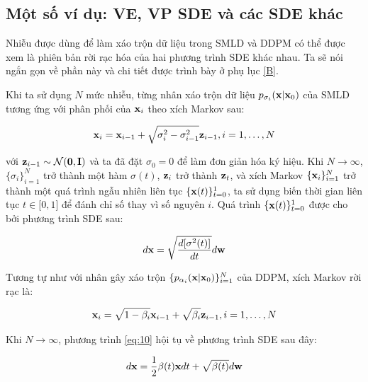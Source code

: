 \documentclass{article} %
\begin{document}
\subsection{Một số ví dụ: VE, VP SDE và các SDE khác}

Nhiễu được dùng để làm xáo trộn dữ liệu trong SMLD và DDPM có thể được xem là phiên bản rời rạc hóa của hai phương trình SDE khác nhau.
Ta sẽ nói ngắn gọn về phần này và chi tiết được trình bày ở phụ lục \ref{B}.

Khi ta sử dụng $N$ mức nhiễu, từng nhân xáo trộn dữ liệu $p_{\sigma_i}(\bold{x} \vert \bold{x}_0)$ của SMLD tương ứng với phân phối của $\bold{x}_i$ theo xích Markov sau:

\begin{equation}
    \bold{x}_i = \bold{x}_{i-1} + \sqrt{\sigma_i^2 - \sigma_{i-1}^2} \bold{z}_{i-1}, i=1, \dots, N
\end{equation}

với $\bold{z}_{i-1} \sim \mathcal{N}(\bold{0}, \bold{I})$ và ta đã đặt $\sigma_0=0$ để làm đơn giản hóa ký hiệu.
Khi $N \rightarrow \infty$, $\lbrace \sigma_i \rbrace_{i=1}^N$ trở thành một hàm $\sigma(t)$, $\bold{z}_i$ trở thành $\bold{z}_t$, và xích Markov $\lbrace \bold{x}_i \rbrace_{i=1}^N$ trở thành một quá trình ngẫu nhiên liên tục $\lbrace \bold{x}(t) \rbrace_{t=0}^1$, ta sử dụng biến thời gian liên tục $t \in \lbrack 0, 1 \rbrack$ để đánh chỉ số thay vì số nguyên $i$.
Quá trình $\lbrace \bold{x}(t) \rbrace_{t=0}^1$ được cho bởi phương trình SDE sau:

\begin{equation} \label{eq:9}
    d \bold{x} = \sqrt{\dfrac{d \lbrack \sigma^2(t) \rbrack}{dt}} d \bold{w}
\end{equation}

Tương tự như với nhân gây xáo trộn $\lbrace p_{\alpha_i} (\bold{x} \vert \bold{x}_0) \rbrace_{i=1}^N$ của DDPM, xích Markov rời rạc là:

\begin{equation} \label{eq:10}
    \bold{x}_i = \sqrt{1 - \beta_i} \bold{x}_{i-1} + \sqrt{\beta_i} \bold{z}_{i-1}, i=1,\dots,N
\end{equation}

Khi $N \rightarrow \infty$, phương trình \ref{eq:10} hội tụ về phương trình SDE sau đây:

\begin{equation} \label{eq:11}
    d \bold{x} = \dfrac{1}{2} \beta(t) \bold{x} dt + \sqrt{\beta(t)} d\bold{w}
\end{equation}
\end{document}
